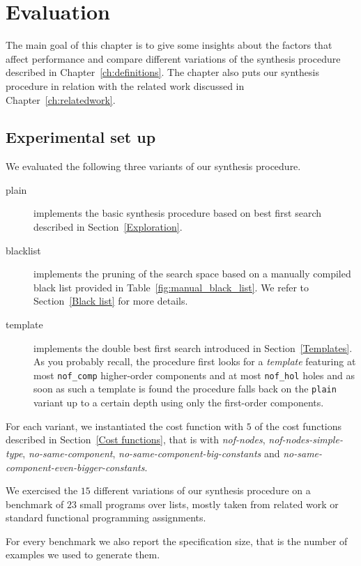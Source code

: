 \chapter{Evaluation} \label{evaluation}

The main goal of this chapter is to give some insights about the factors that affect performance and compare different variations of the synthesis procedure described in Chapter~\ref{ch:definitions}. The chapter also puts our synthesis procedure in relation with the related work discussed in Chapter~\ref{ch:relatedwork}.


\section{Experimental set up}
We evaluated the following three variants of our synthesis procedure.
\begin{description}
\item[plain] implements the basic synthesis procedure based on best first search described in Section~\ref{Exploration}.
\item[blacklist] implements the pruning of the search space based on a manually compiled black list provided in Table~\ref{fig:manual_black_list}. We refer to Section~\ref{Black list} for more details.
\item[template] implements the double best first search introduced in Section~\ref{Templates}. As you probably recall, the procedure first looks for a \emph{template} featuring at most \lstinline?nof_comp? higher-order components and at most \lstinline?nof_hol? holes and as soon as such a template is found the procedure falls back on the \lstinline?plain? variant up to a certain depth using only the first-order components.
\end{description}
For each variant, we instantiated the cost function with $5$ of the cost functions described in Section~\ref{Cost functions}, that is with \textit{nof-nodes}, \textit{nof-nodes-simple-type}, \textit{no-same-component}, \textit{no-same-component-big-constants} and \textit{no-same-component-even-bigger-constants}.

We exercised the $15$ different variations of our synthesis procedure on a benchmark of $23$ small programs over lists, mostly taken from related work or standard functional programming assignments.

For every benchmark we also report the specification size, that is the number of examples we used to generate them.

